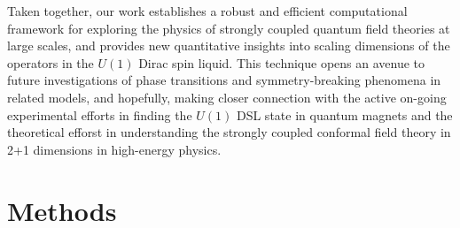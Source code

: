 \documentclass[aps,prl,twocolumn,superscriptaddress,showpacs,longbibliography]{revtex4-2}
\begin{document}
Taken together, our work establishes a robust and efficient computational framework for exploring the physics of strongly coupled quantum field theories at large scales, and provides new quantitative insights into scaling dimensions of the operators in the $U(1)$ Dirac spin liquid. This technique opens an avenue to future investigations of phase transitions and symmetry-breaking phenomena in related models, and hopefully, making closer connection with the active on-going experimental efforts in finding the $U(1)$ DSL state in quantum magnets and the theoretical efforst in understanding the strongly coupled conformal field theory in 2+1 dimensions in high-energy physics.














\section{Methods}


\end{document}
